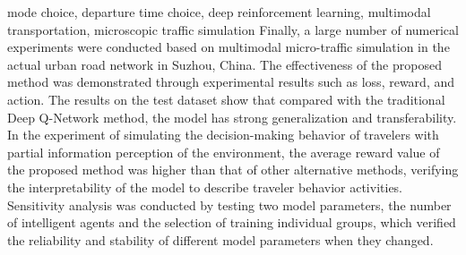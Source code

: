 \begin{englishabstract}{mode choice, departure time choice, deep reinforcement learning, multimodal transportation, microscopic traffic simulation}
Finally, a large number of numerical experiments were conducted based on multimodal micro-traffic simulation in the actual urban road network in Suzhou, China. The effectiveness of the proposed method was demonstrated through experimental results such as loss, reward, and action. The results on the test dataset show that compared with the traditional Deep Q-Network method, the model has strong generalization and transferability. In the experiment of simulating the decision-making behavior of travelers with partial information perception of the environment, the average reward value of the proposed method was higher than that of other alternative methods, verifying the interpretability of the model to describe traveler behavior activities. Sensitivity analysis was conducted by testing two model parameters, the number of intelligent agents and the selection of training individual groups, which verified the reliability and stability of different model parameters when they changed.
\end{englishabstract}
